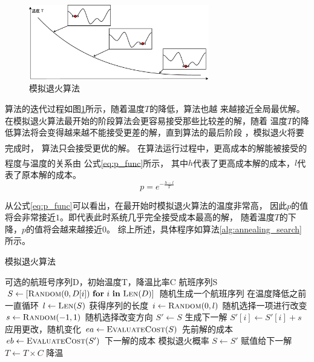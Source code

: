 \documentclass[fontset=fandol,a4paper,zihao=5]{ctexart}
\newcommand{\upcite}[1]{\textsuperscript{\textsuperscript{\cite{#1}}}}
\begin{document}
			
			\begin{figure}[!h]
				\centering
				\includegraphics[width=0.7\textwidth]{pic/annle.eps}
				\caption{\label{fig:annle}模拟退火算法}
			\end{figure}
			算法的迭代过程如图\ref{fig:annle}所示，随着温度$T$的降低，算法也越
            来越接近全局最优解。
			在模拟退火算法最开始的阶段算法会更容易接受那些比较差的解，随着
            温度$T$的降低算法将会变得越来越不能接受更差的解，直到算法的最后阶段
            ，模拟退火将要完成时，
            算法只会接受更优的解\upcite{高尚2002模拟退火算法中的退火策略研究}。
			在算法运行过程中，更高成本的解能被接受的程度与温度的关系由
            公式\ref{eq:p_func}所示\upcite{Kirkpatrick1987Optimization}，
            其中$h$代表了更高成本解的成本，$l$代表了原本解的成本。
			\begin{equation}
			p=e^{-\frac{h-l}{T}}
			\label{eq:p_func}
			\end{equation}
			
			从公式\ref{eq:p_func}可以看出，在最开始时模拟退火算法的温度非常高，
            因此$p$的值将会非常接近$1$。即代表此时系统几乎完全接受成本最高的解，
            随着温度$T$的下降，$p$的值将会越来越接近$0$。
			综上所述，具体程序如算法\ref{alg:annealing_search}所示。
			\begin{algorithm}
				\begin{algorithmic}
					\caption{\label{alg:annealing_search}模拟退火算法}
					\Require $\text{可选的航班号序列D，初始温度T，降温比率C}$
					\Ensure $\text{航班序列S}$
					\State $S \gets [ \Call{Random}{0,D[i]}\ \textbf{for}\ i\ \textbf{in}\ \Call{Len}{D}]$ \Comment 随机生成一个航班序列
					 \Comment 在温度降低之前一直循环
						\State $l \gets \Call{Len}{S}$ \Comment 获得序列的长度
						\State $i \gets \Call{Random}{0,l}$ \Comment 随机选择一项进行改变
						\State $s \gets \Call{Random}{-1,1}$ \Comment 随机选择改变方向
						\State $S' \gets S$ \Comment 生成下一解
						\State $S'[i] \gets S'[i] + s$ \Comment 应用更改，随机变化
						\State $ea \gets \Call{EvaluateCost}{S}$ \Comment 先前解的成本
						\State $eb \gets \Call{EvaluateCost}{S'}$ \Comment 下一解的成本
						 \Comment 模拟退火概率
							\State $S \gets S'$ \Comment 赋值给下一解
						\EndIf
						\State $T \gets T \times C$ \Comment 降温
					\EndWhile
					\State {}
					\EndFunction
				\end{algorithmic}
			\end{algorithm}
		
\end{document}
